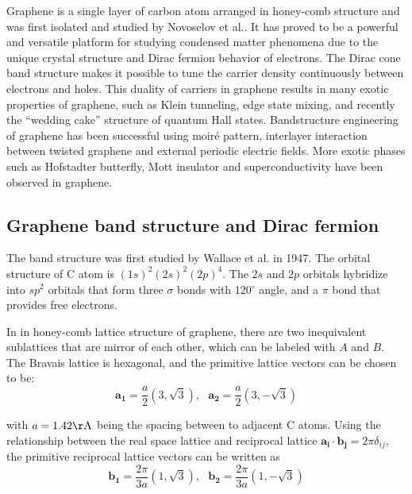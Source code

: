 \documentclass[pdflatex, sectionletters, 12pt]{pittetd}    %
\begin{document}
Graphene is a single layer of carbon atom arranged in honey-comb structure and was first isolated and studied by Novoselov et al.\cite{novoselov2004electric}. It has proved to be a powerful and versatile platform for studying condensed matter phenomena due to the unique crystal structure and Dirac fermion behavior of electrons\cite{wilson2006electrons}. The Dirac cone band structure makes it possible to tune the carrier density continuously between electrons and holes. This duality of carriers in graphene results in many exotic properties of graphene, such as Klein tunneling\cite{allain2011klein, katsnelson2006chiral, young2009quantum, shytov2008klein}, edge state mixing\cite{williams2007quantum, abanin2007quantized, lohmann2009four, amet2014selective}, and recently the ``wedding cake'' structure of quantum Hall states\cite{gutierrez2018interaction}. Bandstructure engineering of graphene has been successful using moir{\'e} pattern\cite{dean2013hofstadter, hunt2013massive, ponomarenko2013cloing}, interlayer interaction between twisted graphene\cite{cao2018correlated, cao2018unconventional} and external periodic electric fields\cite{forsythe2018band}. More exotic phases such as Hofstadter butterfly\cite{dean2013hofstadter, hunt2013massive, forsythe2018band}, Mott insulator\cite{cao2018correlated} and superconductivity\cite{cao2018unconventional} have been observed in graphene.

\subsection{Graphene band structure and Dirac fermion}

The band structure was first studied by Wallace et al. in 1947\cite{wallace1947band}. The orbital structure of C atom is $(1s)^2(2s)^2(2p)^4$. The $2s$ and $2p$ orbitals hybridize into $sp^2$ orbitals that form three $\sigma$ bonds with 120$^{\circ}$ angle, and a $\pi$ bond that provides free electrons. 

In in honey-comb lattice structure of graphene, there are two inequivalent sublattices that are mirror of each other, which can be labeled with $A$ and $B$. The Bravais lattice is hexagonal, and the primitive lattice vectors can be chosen to be: 
$$\mathbf{a_1} = \frac{a}{2}\left(3, \sqrt{3}\right), \ \ \ \mathbf{a_2} = \frac{a}{2}\left(3, -\sqrt{3}\right)$$

with $a = 1.42\mathrm{\AA}$ being the spacing between to adjacent C atoms. Using the relationship between the real space lattice and reciprocal lattice $\mathbf{a_i}\cdot\mathbf{b_j} = 2\pi\delta_{ij}$, the primitive reciprocal lattice vectors can be written as 
$$\mathbf{b_1} = \frac{2\pi}{3a}\left(1, \sqrt{3}\right), \ \ \ \mathbf{b_2} = \frac{2\pi}{3a}\left(1, -\sqrt{3}\right)$$
\end{document}

